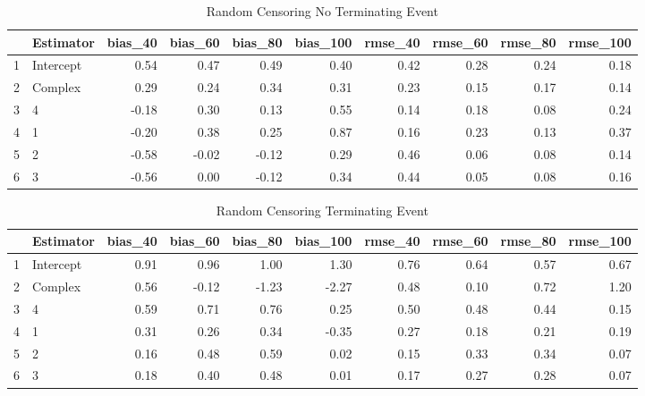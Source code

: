 \begin{table}[ht]
\centering
\begin{tabular}{rlrrrrrrrr}
  \hline
 & Estimator & bias\_40 & bias\_60 & bias\_80 & bias\_100 & rmse\_40 & rmse\_60 & rmse\_80 & rmse\_100 \\ 
  \hline
1 & Intercept & 0.54 & 0.47 & 0.49 & 0.40 & 0.42 & 0.28 & 0.24 & 0.18 \\ 
  2 & Complex & 0.29 & 0.24 & 0.34 & 0.31 & 0.23 & 0.15 & 0.17 & 0.14 \\ 
  3 & 4 & -0.18 & 0.30 & 0.13 & 0.55 & 0.14 & 0.18 & 0.08 & 0.24 \\ 
  4 & 1 & -0.20 & 0.38 & 0.25 & 0.87 & 0.16 & 0.23 & 0.13 & 0.37 \\ 
  5 & 2 & -0.58 & -0.02 & -0.12 & 0.29 & 0.46 & 0.06 & 0.08 & 0.14 \\ 
  6 & 3 & -0.56 & 0.00 & -0.12 & 0.34 & 0.44 & 0.05 & 0.08 & 0.16 \\ 
   \hline
\end{tabular}
\caption{Random Censoring 
 No Terminating Event} 
\end{table}
\begin{table}[ht]
\centering
\begin{tabular}{rlrrrrrrrr}
  \hline
 & Estimator & bias\_40 & bias\_60 & bias\_80 & bias\_100 & rmse\_40 & rmse\_60 & rmse\_80 & rmse\_100 \\ 
  \hline
1 & Intercept & 0.91 & 0.96 & 1.00 & 1.30 & 0.76 & 0.64 & 0.57 & 0.67 \\ 
  2 & Complex & 0.56 & -0.12 & -1.23 & -2.27 & 0.48 & 0.10 & 0.72 & 1.20 \\ 
  3 & 4 & 0.59 & 0.71 & 0.76 & 0.25 & 0.50 & 0.48 & 0.44 & 0.15 \\ 
  4 & 1 & 0.31 & 0.26 & 0.34 & -0.35 & 0.27 & 0.18 & 0.21 & 0.19 \\ 
  5 & 2 & 0.16 & 0.48 & 0.59 & 0.02 & 0.15 & 0.33 & 0.34 & 0.07 \\ 
  6 & 3 & 0.18 & 0.40 & 0.48 & 0.01 & 0.17 & 0.27 & 0.28 & 0.07 \\ 
   \hline
\end{tabular}
\caption{Random Censoring 
 Terminating Event} 
\end{table}
